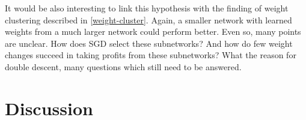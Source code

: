 It would be also interesting to link this hypothesis with the finding of weight clustering described in \ref{weight-cluster}. Again, a smaller network with learned weights from a much larger network could perform better.
Even so, many points are unclear. How does SGD select these subnetworks?  And how do few weight changes succeed in taking profits from these subnetworks? What the reason for double descent, many questions which still need to be answered.



\newpage









\section{Discussion}
    \label{Discussion}

